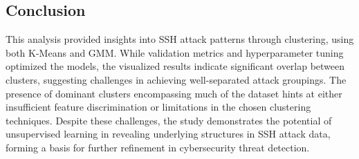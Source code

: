     \subsection{Conclusion}
        

        This analysis provided insights into SSH attack patterns through clustering, using both K-Means and GMM. While validation metrics and hyperparameter tuning optimized the models, the visualized results indicate significant overlap between clusters, suggesting challenges in achieving well-separated attack groupings. The presence of dominant clusters encompassing much of the dataset hints at either insufficient feature discrimination or limitations in the chosen clustering techniques. Despite these challenges, the study demonstrates the potential of unsupervised learning in revealing underlying structures in SSH attack data, forming a basis for further refinement in cybersecurity threat detection.
        